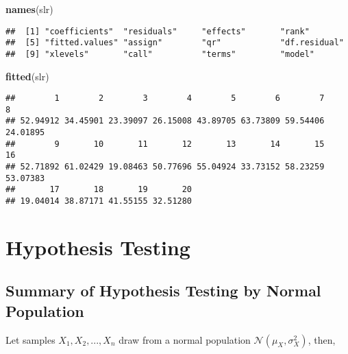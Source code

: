 \documentclass[
]{book}
\newenvironment{Shaded}{\begin{snugshade}}{\end{snugshade}}
\newcommand{\KeywordTok}[1]{\textcolor[rgb]{0.13,0.29,0.53}{\textbf{#1}}}
\newcommand{\NormalTok}[1]{#1}
\theoremstyle{definition}
\theoremstyle{definition}
\theoremstyle{definition}
\theoremstyle{remark}
\begin{document}
\begin{Shaded}
\begin{Highlighting}[]
\KeywordTok{names}\NormalTok{(slr)}
\end{Highlighting}
\end{Shaded}

\begin{verbatim}
##  [1] "coefficients"  "residuals"     "effects"       "rank"         
##  [5] "fitted.values" "assign"        "qr"            "df.residual"  
##  [9] "xlevels"       "call"          "terms"         "model"
\end{verbatim}

\begin{Shaded}
\begin{Highlighting}[]
\KeywordTok{fitted}\NormalTok{(slr)}
\end{Highlighting}
\end{Shaded}

\begin{verbatim}
##        1        2        3        4        5        6        7        8 
## 52.94912 34.45901 23.39097 26.15008 43.89705 63.73809 59.54406 24.01895 
##        9       10       11       12       13       14       15       16 
## 52.71892 61.02429 19.08463 50.77696 55.04924 33.73152 58.23259 53.07383 
##       17       18       19       20 
## 19.04014 38.87171 41.55155 32.51280
\end{verbatim}

\hypertarget{hypothesis-testing}{%
\chapter{Hypothesis Testing}\label{hypothesis-testing}}

\hypertarget{summary-of-hypothesis-testing-by-normal-population}{%
\section{Summary of Hypothesis Testing by Normal Population}\label{summary-of-hypothesis-testing-by-normal-population}}

Let samples \(X_1,X_2,...,X_n\) draw from a normal population \(\mathcal{N}(\mu_X,\sigma^2_X)\), then,
\end{document}
